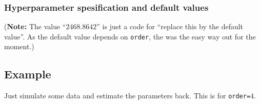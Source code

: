 \documentclass[a4paper,11pt]{article}
\begin{document}
\subsubsection*{Hyperparameter spesification and default values}

(\textbf{Note:} The value ``$2468.8642$'' is just a code for ``replace
this by the default value''. As the default value depends on
\texttt{order}, the was the easy way out for the moment.)




\subsection*{Example}

Just simulate some data and estimate the parameters back. This is for
\texttt{order=}$4$.

{\small}
\end{document}
